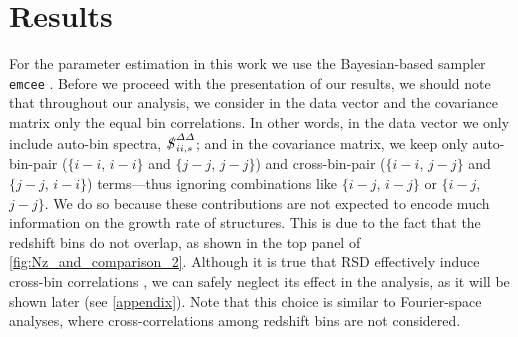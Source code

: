 \documentclass[astrosymb,twocolumn]{aastex631}
\newcommand{\bs}{\ensuremath{b\sigma_8}}
\renewcommand{\fs}{\ensuremath{f\!\sigma_8}}
\newcommand{\kost}[1]{\textcolor{orange}{#1}}
\begin{document}
\section{Results}
\label{sec:result}
For the parameter estimation in this work we use the Bayesian-based sampler \texttt{emcee} \citep{ForemanMackey2013}. Before we proceed with the presentation of our results, we should note that throughout our analysis, we consider in the data vector and the covariance matrix only the equal bin correlations. In other words, in the data vector we only include auto-bin spectra, $\slashed{S}^{\varDelta\varDelta}_{ii,s}$; and in the covariance matrix, we keep only auto-bin-pair ($\{i-i$, $i-i\}$ and $\{j-j$, $j-j\}$) and cross-bin-pair ($\{i-i$, $j-j\}$ and $\{j-j$, $i-i\}$) terms---thus ignoring combinations like $\{i-j$, $i-j\}$ or $\{i-j$, $j-j\}$.
We do so because these contributions are not expected to encode much information on the growth rate of structures. This is due to the fact that the redshift bins do not overlap, as shown in the top panel of \autoref{fig:Nz_and_comparison_2}. Although it is true that RSD effectively induce cross-bin correlations \citep[see][for a heuristic explanation using not the exact solution as in this paper but rather the Limber approximation]{2019MNRAS.489.3385T}, we can safely neglect its effect in the analysis, as it will be shown later (see \autoref{appendix}). Note that this choice is similar to Fourier-space analyses, where cross-correlations among redshift bins are not considered.

\end{document}
